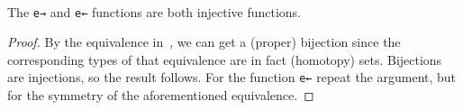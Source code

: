 \documentclass[11pt, a4paper, oneside]{amsart}
\begin{document}
\begin{code}[hide]
\AgdaSymbol{)}\AgdaSpace{}%
\AgdaSymbol{(}\AgdaSpace{}%
\AgdaSymbol{)}\AgdaSpace{}%
\AgdaSymbol{(}\AgdaSpace{}%
\AgdaSymbol{(}\AgdaSpace{}%
\AgdaSymbol{)}\AgdaSpace{}%
\AgdaSymbol{(}\AgdaSpace{}%
\AgdaSymbol{)}\AgdaSpace{}%
\AgdaSymbol{(}\AgdaSpace{}%
\AgdaSymbol{))}\AgdaSpace{}%
\AgdaSpace{}%
\AgdaSpace{}%
\<%
\\
%
\>[6]\AgdaSpace{}%
\AgdaSymbol{=}\AgdaSpace{}%
\AgdaSpace{}%
\AgdaSpace{}%
\AgdaSpace{}%
\AgdaSpace{}%
\AgdaSpace{}%
\AgdaSpace{}%
\<%
\end{code}

\begin{proposition}\label{e-gives-injective-functions}
The \texttt{e→} and \texttt{e←} functions are both injective functions.
\end{proposition}

\begin{proof} By the equivalence in~, we can get a
(proper) bijection since the corresponding types of that equivalence are in
fact (homotopy) sets. Bijections are injections, so the result follows. For
the function \texttt{e←} repeat the argument, but for the symmetry of the
aforementioned equivalence. \end{proof}
\end{document}

